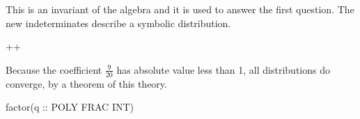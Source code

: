{{{{{{{{{{{{{{{{{{\begin{xtc}
\begin{xtccomment}
This is an invariant of the algebra and it is used to answer
the first question.
The new indeterminates describe a symbolic distribution.
\end{xtccomment}
\begin{TeXOutput}
\begin{fricasmath}{9}
+\TIMES {}+\TIMES {}%
\end{fricasmath}
\end{TeXOutput}
\end{xtc}
\begin{xtc}
\begin{xtccomment}
Because the coefficient $$ has absolute
value less than 1, all distributions do converge,
by a theorem of this theory.
\end{xtccomment}
\begin{spadsrc}
factor(q :: POLY FRAC INT) 
\end{spadsrc}
\begin{TeXOutput}
\begin{fricasmath}{10}
\TIMES {}\TIMES {}%
\end{fricasmath}
\end{TeXOutput}
\end{xtc}
}}}}}}}}}}}}}}}}}}
